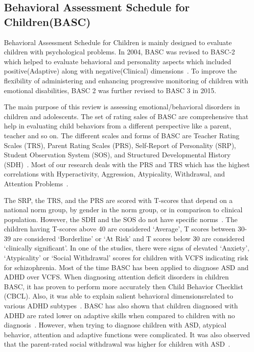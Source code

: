 \subsection{Behavioral Assessment Schedule for Children(BASC)}
Behavioral Assessment Schedule for Children is mainly designed to evaluate children with psychological problems. In 2004, BASC was revised to BASC-2 which helped to evaluate behavioral and personality aspects which included positive(Adaptive) along with negative(Clinical) dimensions~\cite{american2013diagnostic}. To improve the flexibility of administering and enhancing progressive monitoring of children with emotional disabilities, BASC 2 was further revised to BASC 3 in 2015.

The main purpose of this review is assessing emotional/behavioral disorders in children and adolescents. The set of rating sales of BASC are comprehensive that help in evaluating child behaviors from a different perspective like a parent, teacher and so on. The different scales and forms of BASC are Teacher Rating Scales (TRS), Parent Rating Scales (PRS), Self-Report of Personality (SRP), Student Observation System (SOS), and Structured Developmental History (SDH)~\cite{american2013diagnostic}. Most of our research deals with the PRS and TRS which has the highest correlations with Hyperactivity, Aggression, Atypicality, Withdrawal, and Attention Problems~\cite{american2013diagnostic}.

The SRP, the TRS, and the PRS are scored with T-scores that depend on a national norm group, by gender in the norm group, or in comparison to clinical population. However, the SDH and the SOS do not have specific norms~\cite{american2013diagnostic}. The children having T-scores above 40 are considered `Average', T scores between 30-39 are considered `Borderline' or `At Risk' and T scores below 30 are considered `clinically significant'. 
\newline
\newline
In one of the studies, there were signs of elevated `Anxiety', `Atypicality' or `Social Withdrawal' scores for children with VCFS indicating risk for schizophrenia\cite{kates2015neurocognitive}. Most of the time BASC has been applied to diagnose ASD and ADHD over VCFS. When diagnosing attention deficit disorders in children BASC, it has proven to perform more accurately then Child Behavior Checklist (CBCL). Also, it was able to explain salient behavioral dimensionsrelated to various ADHD subtypes~\cite{ostrander1998diagnosing}. BASC has also shown that children diagnosed with ADHD are rated lower on adaptive skills when compared to children with no diagnosis~\cite{jarratt2005assessment}. However, when trying to diagnose children with ASD, atypical behavior, attention and adaptive functions were complicated. It was also observed that the parent-rated social withdrawal was higher for children with ASD~\cite{gardner2017comparing}.

